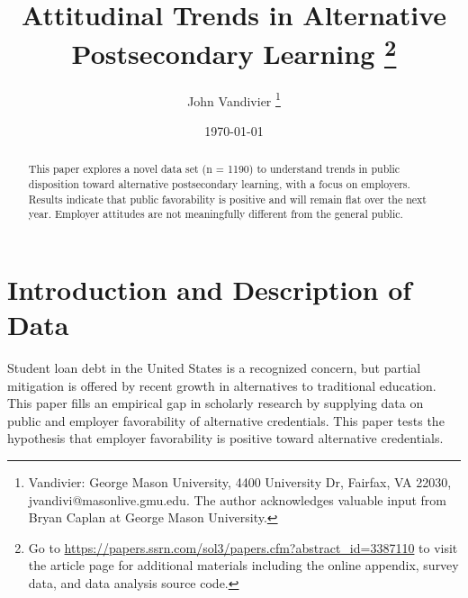\documentclass[AER]{./aea-latex-templates/AEA}
\begin{document}
        
        \title{Attitudinal Trends in Alternative Postsecondary Learning
            \thanks{
                Go to \url{https://papers.ssrn.com/sol3/papers.cfm?abstract_id=3387110} to visit
                the article page for additional materials including the online appendix,
                survey data, and data analysis source code.
            }
        }
        \author{John Vandivier
            \thanks{
                    Vandivier: George Mason University,
                    4400 University Dr, Fairfax, VA 22030,
                    jvandivi@masonlive.gmu.edu.
                    The author acknowledges valuable input from Bryan Caplan at George Mason University.
                }
            }
        \date{\today}

        \begin{abstract}
        This paper explores a novel data set (n = 1190) to understand trends in public
        disposition toward alternative postsecondary learning, with a focus on employers.
        Results indicate that public favorability is positive and will remain flat over the next year.
        Employer attitudes are not meaningfully different from the general public.
        \end{abstract}

        \maketitle
        
        \section{Introduction and Description of Data}

        Student loan debt in the United States is a recognized concern\cite{friedman2018student},
        but partial mitigation is offered by recent growth in alternatives to traditional education.
        This paper fills an empirical gap in scholarly research by supplying
        data on public and employer favorability of alternative credentials.
        This paper tests the hypothesis that employer favorability is positive toward alternative credentials.
        
\end{document}
